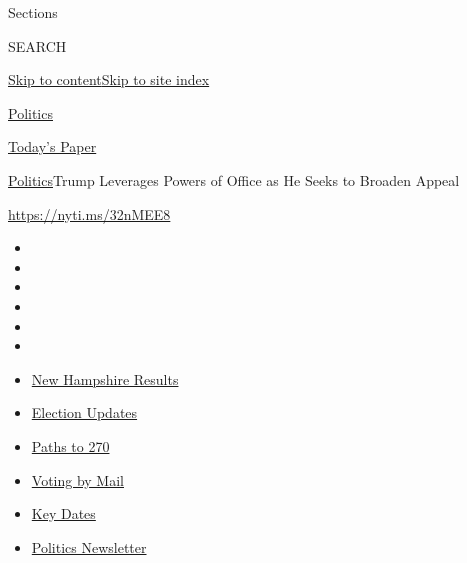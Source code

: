 Sections

SEARCH

\protect\hyperlink{site-content}{Skip to
content}\protect\hyperlink{site-index}{Skip to site index}

\href{https://www.nytimes3xbfgragh.onion/section/politics}{Politics}

\href{https://myaccount.nytimes3xbfgragh.onion/auth/login?response_type=cookie\&client_id=vi}{}

\href{https://www.nytimes3xbfgragh.onion/section/todayspaper}{Today's
Paper}

\href{/section/politics}{Politics}\textbar{}Trump Leverages Powers of
Office as He Seeks to Broaden Appeal

\url{https://nyti.ms/32nMEE8}

\begin{itemize}
\item
\item
\item
\item
\item
\item
\end{itemize}

\begin{itemize}
\item
  \href{https://www.nytimes3xbfgragh.onion/interactive/2020/09/08/us/elections/results-new-hampshire-primary-elections.html?action=click\&pgtype=Article\&state=default\&region=TOP_BANNER\&context=storylines_menu}{New
  Hampshire Results}
\item
  \href{https://www.nytimes3xbfgragh.onion/live/2020/09/08/us/trump-vs-biden?action=click\&pgtype=Article\&state=default\&region=TOP_BANNER\&context=storylines_menu}{Election
  Updates}
\item
  \href{https://www.nytimes3xbfgragh.onion/interactive/2020/us/elections/election-states-biden-trump.html?action=click\&pgtype=Article\&state=default\&region=TOP_BANNER\&context=storylines_menu}{Paths
  to 270}
\item
  \href{https://www.nytimes3xbfgragh.onion/interactive/2020/08/31/us/politics/vote-by-mail-deadlines.html?action=click\&pgtype=Article\&state=default\&region=TOP_BANNER\&context=storylines_menu}{Voting
  by Mail}
\item
  \href{https://www.nytimes3xbfgragh.onion/interactive/2019/us/elections/2020-presidential-election-calendar.html?action=click\&pgtype=Article\&state=default\&region=TOP_BANNER\&context=storylines_menu}{Key
  Dates}
\item
  \href{https://www.nytimes3xbfgragh.onion/newsletters/politics?action=click\&pgtype=Article\&state=default\&region=TOP_BANNER\&context=storylines_menu}{Politics
  Newsletter}
\end{itemize}

